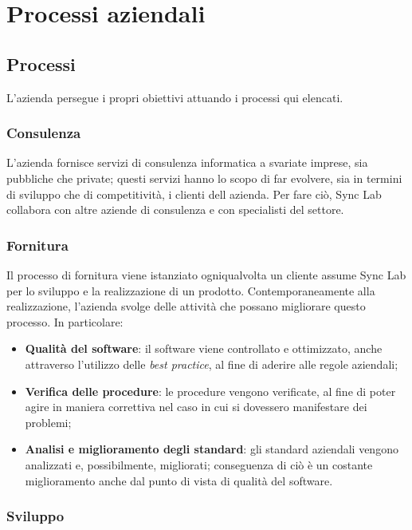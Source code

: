 \section{Processi aziendali}

\subsection{Processi}

L'azienda persegue i propri obiettivi attuando i processi qui elencati.

\subsubsection*{Consulenza}

L'azienda fornisce servizi di consulenza informatica a svariate imprese, sia pubbliche che private; questi servizi hanno lo scopo di far evolvere, sia in termini di sviluppo che di competitività, i clienti dell azienda. Per fare ciò, Sync Lab collabora con altre aziende di consulenza e con specialisti del settore.

\subsubsection*{Fornitura}

Il processo di fornitura viene istanziato ogniqualvolta un cliente assume Sync Lab per lo sviluppo e la realizzazione di un prodotto. Contemporaneamente alla realizzazione, l'azienda svolge delle attività che possano migliorare questo processo. In particolare:
\begin{itemize}
  \item \textbf{Qualità del software}: il software viene controllato e ottimizzato, anche attraverso l'utilizzo delle \textit{best practice}, al fine di aderire alle regole aziendali;
  \item \textbf{Verifica delle procedure}: le procedure vengono verificate, al fine di poter agire in maniera correttiva nel caso in cui si dovessero manifestare dei problemi;
  \item \textbf{Analisi e miglioramento degli standard}: gli standard aziendali vengono analizzati e, possibilmente, migliorati; conseguenza di ciò è un costante miglioramento anche dal punto di vista di qualità del software.
\end{itemize}

\subsubsection*{Sviluppo}

